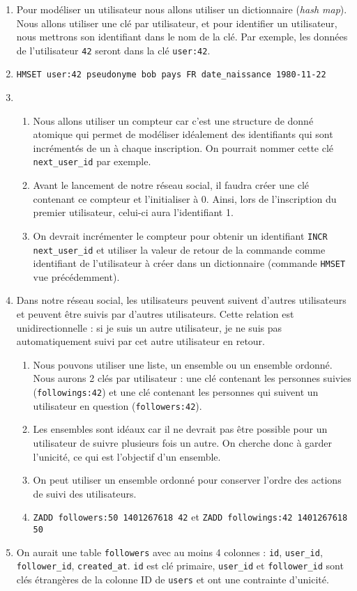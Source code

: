 \documentclass[a4paper,10pt]{article}
\begin{document}
    \begin{enumerate}
      \item Pour modéliser un utilisateur nous allons utiliser un dictionnaire (\textit{hash map}). Nous allons utiliser une clé par utilisateur, et pour identifier un utilisateur, nous mettrons son identifiant dans le nom de la clé. Par exemple, les données de l'utilisateur \texttt{42} seront dans la clé \texttt{user:42}.
      \item \texttt{HMSET user:42 pseudonyme bob pays FR date\_naissance 1980-11-22}
      \item
        \begin{enumerate}
          \item Nous allons utiliser un compteur car c'est une structure de donné atomique qui permet de modéliser idéalement des identifiants qui sont incrémentés de un à chaque inscription. On pourrait nommer cette clé \texttt{next\_user\_id} par exemple.
          \item Avant le lancement de notre réseau social, il faudra créer une clé contenant ce compteur et l'initialiser à 0. Ainsi, lors de l'inscription du premier utilisateur, celui-ci aura l'identifiant 1.
          \item On devrait incrémenter le compteur pour obtenir un identifiant \texttt{INCR next\_user\_id} et utiliser la valeur de retour de la commande comme identifiant de l'utilisateur à créer dans un dictionnaire (commande \texttt{HMSET} vue précédemment).
        \end{enumerate}
      \item Dans notre réseau social, les utilisateurs peuvent suivent d'autres utilisateurs et peuvent être suivis par d'autres utilisateurs. Cette relation est unidirectionnelle : si je suis un autre utilisateur, je ne suis pas automatiquement suivi par cet autre utilisateur en retour.
        \begin{enumerate}
          \item Nous pouvons utiliser une liste, un ensemble ou un ensemble ordonné. Nous aurons 2 clés par utilisateur : une clé contenant les personnes suivies (\texttt{followings:42}) et une clé contenant les personnes qui suivent un utilisateur en question (\texttt{followers:42}).
          \item Les ensembles sont idéaux car il ne devrait pas être possible pour un utilisateur de suivre plusieurs fois un autre. On cherche donc à garder l'unicité, ce qui est l'objectif d'un ensemble.
          \item  On peut utiliser un ensemble ordonné pour conserver l'ordre des actions de suivi des utilisateurs.
          \item \texttt{ZADD followers:50 1401267618 42} et \texttt{ZADD followings:42 1401267618 50}
        \end{enumerate}
      \item On aurait une table \texttt{followers} avec au moins 4 colonnes : \texttt{id}, \texttt{user\_id}, \texttt{follower\_id}, \texttt{created\_at}. \texttt{id} est clé primaire, \texttt{user\_id} et \texttt{follower\_id} sont clés étrangères de la colonne ID de \texttt{users} et ont une contrainte d'unicité.
    \end{enumerate}
\end{document}
